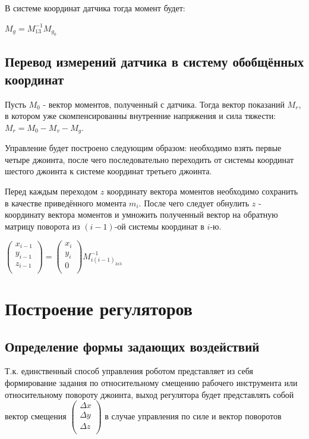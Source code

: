 \documentclass[a4paper,14pt,russian]{extreport} \usepackage{extsizes}
\begin{document}
		В системе координат датчика тогда момент будет:
		
		$M_{g}=M_{13}^{-1}M_{g_0}$
		
		\subsection{Перевод измерений датчика в систему обобщённых координат}
		Пусть $M_{0}$ - вектор моментов, полученный с датчика. Тогда вектор показаний $M_{r}$, в котором уже скомпенсированны внутренние напряжения и сила тяжести:
		$M_{r}=	M_{0}-M_{v}-M_{g}$.		
		
		Управление будет построено следующим образом: необходимо взять первые четыре джоинта, после чего последовательно переходить от системы координат шестого джоинта к системе координат третьего джоинта.
		
		Перед каждым переходом $z$ координату вектора моментов необходимо сохранить в качестве приведённого момента $m_{i}$. После чего следует обнулить $z$ - координату вектора моментов и умножить полученный вектор на обратную матрицу поворота из $(i-1)$-ой системы координат в $i$-ю.
		
		$\begin{pmatrix}
		x_{i-1} \\ y_{i-1} \\ z_{i-1}\\
		\end{pmatrix} = 
		\begin{pmatrix}
		x_{i} \\ y_{i} \\ 0\\
		\end{pmatrix} M_{i(i-1)_{3x3}}^{-1}$
		
		\section{Построение регуляторов}
		\subsection{Определение формы задающих воздействий}
		Т.к. единственный способ управления роботом представляет из себя формирование задания по относительному смещению рабочего инструмента или относительному повороту джоинта, выход регулятора будет представлять собой вектор смещения $\begin{pmatrix}
		\Delta x \\ \Delta y \\ \Delta z \\
		\end{pmatrix} $ в случае управления по силе и вектор поворотов
		
\end{document}
